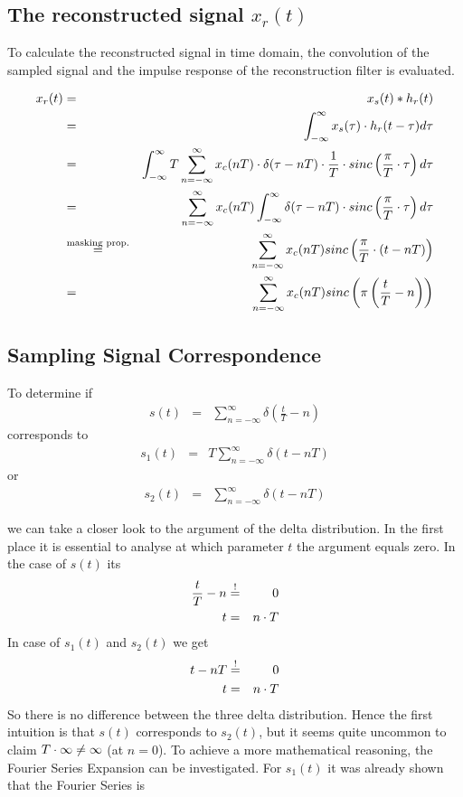 \subsection{The reconstructed signal $x_r(t)$}

To calculate the reconstructed signal in time domain, the convolution of the sampled signal and the impulse response of the reconstruction filter is evaluated.

\begin{eqnarray*}
x_r(t) & = & x_s(t) \ast h_r(t) \\
& = & \int_{-\infty}^{\infty} x_s(\tau) \cdot h_r(t-\tau) d\tau \\
& = & \int_{-\infty}^{\infty} T \sum_{n=-\infty}^{\infty} x_c(nT) \cdot \delta (\tau-nT) \cdot \frac{1}{T} \cdot sinc\left(\frac{\pi}{T}\cdot \tau\right) d\tau \\
& = &  \sum_{n=-\infty}^{\infty} x_c(nT) \int_{-\infty}^{\infty} \delta (\tau-nT) \cdot sinc\left(\frac{\pi}{T}\cdot \tau\right) d\tau  \\
& \overset{\text{masking prop.}}{=} &  \sum_{n=-\infty}^{\infty} x_c(nT) sinc\left(\frac{\pi}{T}\cdot (t-nT)\right) \\
& = &  \sum_{n=-\infty}^{\infty} x_c(nT) sinc\left(\pi \left(\frac{t}{T}-n\right)\right)
\end{eqnarray*}

\subsection{Sampling Signal Correspondence}

To determine if
\begin{eqnarray*}
s(t) & = & \sum_{n=-\infty}^{\infty} \delta \left(\frac{t}{T}-n\right)
\end{eqnarray*}
corresponds to
\begin{eqnarray*}
s_1(t) & = & T \sum_{n=-\infty}^{\infty} \delta (t-nT)
\end{eqnarray*}
or
\begin{eqnarray*}
s_2(t) & = & \sum_{n=-\infty}^{\infty} \delta (t-nT)
\end{eqnarray*}

we can take a closer look to the argument of the delta distribution. In the first place it is essential to analyse at which parameter $t$ the argument equals zero. In the case of $s(t)$ its
\begin{eqnarray*}
\frac{t}{T}-n & \overset{!}{=} & 0 \\
t & = & n\cdot T
\end{eqnarray*}
In case of $s_1(t)$ and $s_2(t)$ we get
\begin{eqnarray*}
t-nT & \overset{!}{=} & 0 \\
t & = & n\cdot T
\end{eqnarray*}
So there is no difference between the three delta distribution. Hence the first intuition is that $s(t)$ corresponds to $s_2(t)$, but it seems quite uncommon to claim $T \cdot \infty \neq \infty$ (at $n = 0$). To achieve a more mathematical reasoning, the Fourier Series Expansion can be investigated. For $s_1(t)$ it was already shown that the Fourier Series is

